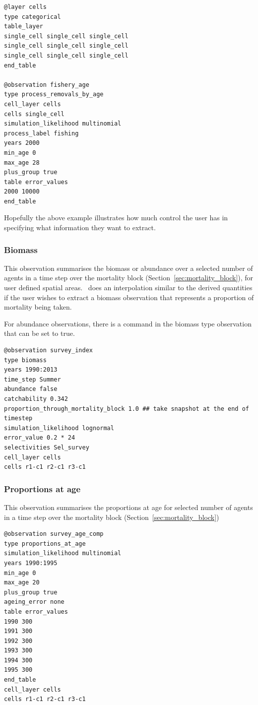 {\small{\begin{verbatim}
@layer cells
type categorical
table_layer
single_cell single_cell single_cell
single_cell single_cell single_cell
single_cell single_cell single_cell
end_table

@observation fishery_age
type process_removals_by_age
cell_layer cells
cells single_cell
simulation_likelihood multinomial
process_label fishing
years 2000
min_age 0
max_age 28
plus_group true
table error_values
2000 10000
end_table
\end{verbatim}}}

Hopefully the above example illustrates how much control the user has in specifying what information they want to extract.

\subsubsection{Biomass}\label{subsubsec:biomass}
This observation summarises the biomass or abundance over a selected number of agents in a time step over the mortality block (Section~\ref{sec:mortality_block}), for user defined spatial areas. \IBM\ does an interpolation similar to the derived quantities if the user wishes to extract a biomass observation that represents a proportion of mortality being taken. 


For abundance observations, there is a command  in the biomass type observation that can be set to true.

{\small{\begin{verbatim}
@observation survey_index
type biomass
years 1990:2013
time_step Summer
abundance false
catchability 0.342
proportion_through_mortality_block 1.0 ## take snapshot at the end of timestep
simulation_likelihood lognormal
error_value 0.2 * 24
selectivities Sel_survey
cell_layer cells
cells r1-c1 r2-c1 r3-c1 
\end{verbatim}}}

\subsubsection{Proportions at age}\label{subsubsec:Proportions_at_age}
This observation summarises the proportions at age for selected number of agents in a time step over the mortality block (Section~\ref{sec:mortality_block})

{\small{\begin{verbatim}
@observation survey_age_comp
type proportions_at_age
simulation_likelihood multinomial
years 1990:1995
min_age 0
max_age 20
plus_group true
ageing_error none
table error_values
1990 300
1991 300
1992 300
1993 300
1994 300
1995 300
end_table
cell_layer cells
cells r1-c1 r2-c1 r3-c1
\end{verbatim}}}


